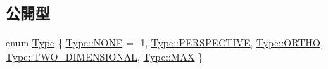 \subsection*{公開型}
\begin{DoxyCompactItemize}
\item 
enum \mbox{\hyperlink{class_camera_a3b0a1f58deca679ac665f61c480d1dcb}{Type}} \{ \newline
\mbox{\hyperlink{class_camera_a3b0a1f58deca679ac665f61c480d1dcbab50339a10e1de285ac99d4c3990b8693}{Type\+::\+N\+O\+NE}} = -\/1, 
\mbox{\hyperlink{class_camera_a3b0a1f58deca679ac665f61c480d1dcbad46c97be63d6c4cb887419a4a3df5347}{Type\+::\+P\+E\+R\+S\+P\+E\+C\+T\+I\+VE}}, 
\mbox{\hyperlink{class_camera_a3b0a1f58deca679ac665f61c480d1dcba9441273d8f694623f0a3cf3e24c29944}{Type\+::\+O\+R\+T\+HO}}, 
\mbox{\hyperlink{class_camera_a3b0a1f58deca679ac665f61c480d1dcba3438f91b4b43888aadc97e739cc258de}{Type\+::\+T\+W\+O\+\_\+\+D\+I\+M\+E\+N\+S\+I\+O\+N\+AL}}, 
\newline
\mbox{\hyperlink{class_camera_a3b0a1f58deca679ac665f61c480d1dcba26a4b44a837bf97b972628509912b4a5}{Type\+::\+M\+AX}}
 \}
\end{DoxyCompactItemize}
